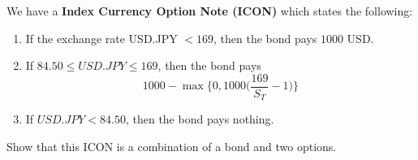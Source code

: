 \documentclass{article}
\begin{document}
  \begin{exercise}[Hull 1.23]
    We have a \textbf{Index Currency Option Note (ICON)} which states the following: 
    \begin{enumerate}
      \item If the exchange rate USD.JPY $ < 169$, then the bond pays $1000$ USD.
      \item If $84.50 \leq USD.JPY \leq 169$, then the bond pays 
        \begin{equation}
          1000 - \max\bigg\{ 0, 1000 \Big( \frac{169}{S_T} - 1 \Big)\bigg\}
        \end{equation}
      \item If $USD.JPY < 84.50$, then the bond pays nothing. 
    \end{enumerate}
    Show that this ICON is a combination of a bond and two options. 
  \end{exercise}
\end{document}
